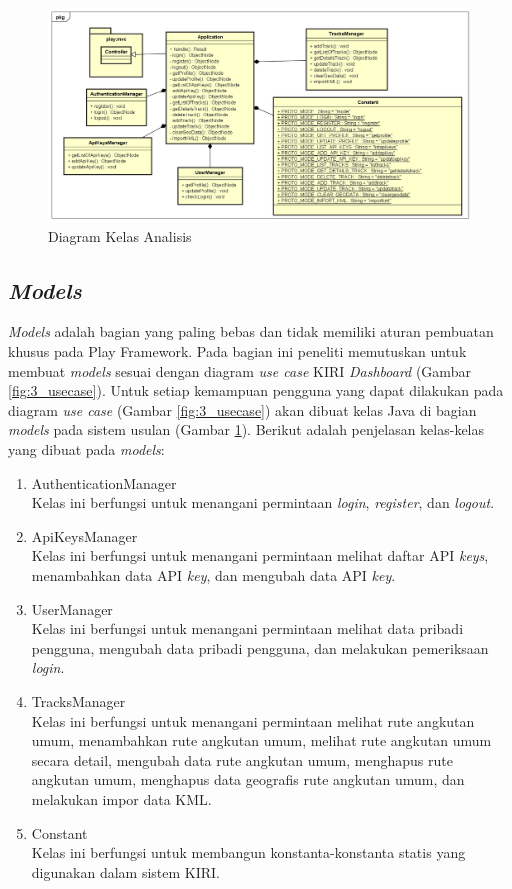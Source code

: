 \begin{figure}[htbp]
	\centering
		\includegraphics[scale=0.47]{Gambar/3_classdiagram_kasar.png}
	\caption{Diagram Kelas Analisis}
	\label{fig:3_classdiagram_kasar}
\end{figure}


\subsection{\textit{Models}}
\label{sec:modelusulan}
\textit{Models} adalah bagian yang paling bebas dan tidak memiliki aturan pembuatan khusus pada Play Framework. Pada bagian ini peneliti memutuskan untuk membuat \textit{models} sesuai dengan diagram \textit{use case} KIRI \textit{Dashboard} (Gambar \ref{fig:3_usecase}). Untuk setiap kemampuan pengguna yang dapat dilakukan pada diagram \textit{use case} (Gambar \ref{fig:3_usecase}) akan dibuat kelas Java di bagian \textit{models} pada sistem usulan (Gambar \ref{fig:3_classdiagram_kasar}). Berikut adalah penjelasan kelas-kelas yang dibuat pada \textit{models}:
\begin{enumerate}
	\item AuthenticationManager\\
	Kelas ini berfungsi untuk menangani permintaan \textit{login}, \textit{register}, dan \textit{logout}.
	\item ApiKeysManager\\
	Kelas ini berfungsi untuk menangani permintaan melihat daftar API \textit{keys}, menambahkan data API \textit{key}, dan mengubah data API \textit{key}.
	\item UserManager\\
	Kelas ini berfungsi untuk menangani permintaan melihat data pribadi pengguna, mengubah data pribadi pengguna, dan melakukan pemeriksaan \textit{login}.
	\item TracksManager\\
	Kelas ini berfungsi untuk menangani permintaan melihat rute angkutan umum, menambahkan rute angkutan umum, melihat rute angkutan umum secara detail, mengubah data rute angkutan umum, menghapus rute angkutan umum, menghapus data geografis rute angkutan umum, dan melakukan impor data KML.
	\item Constant\\
	Kelas ini berfungsi untuk membangun konstanta-konstanta statis yang digunakan dalam sistem KIRI.
\end{enumerate}


